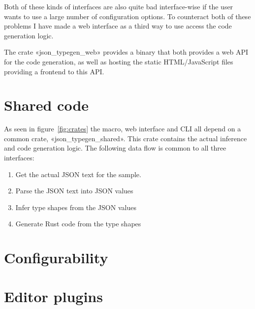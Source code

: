 Both of these kinds of interfaces are also quite bad interface-wise if the user wants to use a large number of configuration options. To counteract both of these problems I have made a web interface as a third way to use access the code generation logic.

The crate «json_typegen_web» provides a binary that both provides a web API for the code generation, as well as hosting the static HTML/JavaScript files providing a frontend to this API.


\section{Shared code}

As seen in figure~\ref{fig:crates} the macro, web interface and CLI all depend on a common crate, «json_typegen_shared». This crate contains the actual inference and code generation logic. The following data flow is common to all three interfaces:

\begin{enumerate}
  \item Get the actual JSON text for the sample.
  \item Parse the JSON text into JSON values
  \item Infer type shapes from the JSON values
  \item Generate Rust code from the type shapes
\end{enumerate}

\section{Configurability}






\section{Editor plugins}

